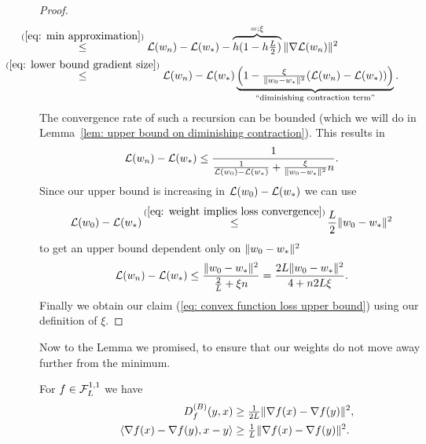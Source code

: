 \begin{proof}
\begin{align*}
		&\lxle{(\ref{eq: min approximation})} \Loss(\weights_n)-\Loss(\minimum)
		- \overbrace{\lr(1-\lr\tfrac{\ubound}2)}^{=:\xi} \|\nabla \Loss(\weights_n)\|^2\\
		&\lxle{(\ref{eq: lower bound gradient size})}
		\Loss(\weights_n)-\Loss(\minimum)
		\underbrace{
			\left(1 - \tfrac{\xi}{\|\weights_0-\minimum\|^2}(\Loss(\weights_n)-\Loss(\minimum))\right)
		}_{\text{``diminishing contraction term''}}.
	\end{align*}
	The convergence rate of such a recursion can be bounded (which we will do in
	Lemma~\ref{lem: upper bound on diminishing contraction}). This results in 
	\begin{align*}
		\mathcal{L}(w_n)-\mathcal{L}(w_*)
		&\le \frac{1}{
			\frac{1}{\mathcal{L}(w_0)-\mathcal{L}(w_*)} + \tfrac{\xi}{\|w_0-w_*\|^2}n
		}.
	\end{align*}
	Since our upper bound is increasing in \(\mathcal{L}(w_0)-\mathcal{L}(w_*)\)
	we can use
	\begin{align*}
		\Loss(\weights_0) - \Loss(\minimum)
		&\xle{(\ref{eq: weight implies loss convergence})}
		\frac{\ubound}{2}\|\weights_0-\minimum\|^2
	\end{align*}
	to get an upper bound dependent only on \(\|w_0 - w_*\|^2\)
	\begin{align*}
		\mathcal{L}(w_n)-\mathcal{L}(w_*)
		&\le \frac{\|w_0-w_*\|^2}{
			\frac{2}{L} + \xi n
		}
		= \frac{2L\|w_0-w_*\|^2}{
			4 + n 2L \xi
		}.
	\end{align*}
	Finally we obtain our claim (\ref{eq: convex function loss upper bound})
	using our definition of \(\xi\).
\end{proof}
%
Now to the Lemma we promised, to ensure that our weights do not move away further
from the minimum.
%
\begin{lemma}\label{lem: bregmanDiv lower bound}
	For \(f\in\mathcal{F}^{1,1}_{L}\) we have
	\begin{subequations}
	\begin{align}
		D^{(B)}_{f}(y,x)
		&\ge \tfrac{1}{2L}\|\nabla f(x) - \nabla f(y)\|^2,\\
		\label{eq: bregmanDiv lower bound b}
		\langle \nabla f(x) - \nabla f(y), x-y\rangle
		&\ge \tfrac{1}{L}\|\nabla f(x) - \nabla f(y)\|^2.
	\end{align}	
	\end{subequations}	
\end{lemma}
